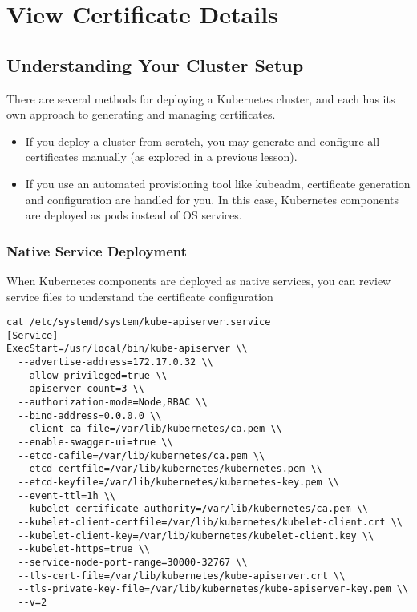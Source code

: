 \documentclass[11pt]{article}
\begin{document}
\section{View Certificate Details}
\label{sec:orgafc6236}

\subsection{Understanding Your Cluster Setup}
\label{sec:org623fd48}
There are several methods for deploying a Kubernetes cluster, and each has its own approach to generating and managing certificates.

\begin{itemize}
\item If you deploy a cluster from scratch, you may generate and configure all certificates manually (as explored in a previous lesson).
\item If you use an automated provisioning tool like kubeadm, certificate generation and configuration are handled for you. In this case, Kubernetes components are deployed as pods instead of OS services.
\end{itemize}
\subsubsection{Native Service Deployment}
\label{sec:org3830c32}
When Kubernetes components are deployed as native services, you can review service files to understand the certificate configuration

\begin{verbatim}
cat /etc/systemd/system/kube-apiserver.service
[Service]
ExecStart=/usr/local/bin/kube-apiserver \\
  --advertise-address=172.17.0.32 \\
  --allow-privileged=true \\
  --apiserver-count=3 \\
  --authorization-mode=Node,RBAC \\
  --bind-address=0.0.0.0 \\
  --client-ca-file=/var/lib/kubernetes/ca.pem \\
  --enable-swagger-ui=true \\
  --etcd-cafile=/var/lib/kubernetes/ca.pem \\
  --etcd-certfile=/var/lib/kubernetes/kubernetes.pem \\
  --etcd-keyfile=/var/lib/kubernetes/kubernetes-key.pem \\
  --event-ttl=1h \\
  --kubelet-certificate-authority=/var/lib/kubernetes/ca.pem \\
  --kubelet-client-certfile=/var/lib/kubernetes/kubelet-client.crt \\
  --kubelet-client-key=/var/lib/kubernetes/kubelet-client.key \\
  --kubelet-https=true \\
  --service-node-port-range=30000-32767 \\
  --tls-cert-file=/var/lib/kubernetes/kube-apiserver.crt \\
  --tls-private-key-file=/var/lib/kubernetes/kube-apiserver-key.pem \\
  --v=2
\end{verbatim}
\end{document}
